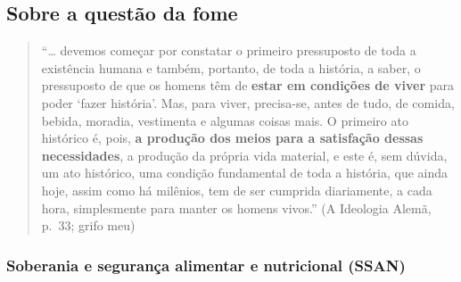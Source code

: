 \hypertarget{sobre-a-questuxe3o-da-fome}{%
\subsection{Sobre a questão da fome}\label{sobre-a-questuxe3o-da-fome}}

\begin{quote}
``\ldots{} devemos começar por constatar o primeiro pressuposto de toda
a existência humana e também, portanto, de toda a história, a saber, o
pressuposto de que os homens têm de \textbf{estar em condições de viver}
para poder `fazer história'. Mas, para viver, precisa-se, antes de tudo,
de comida, bebida, moradia, vestimenta e algumas coisas mais. O primeiro
ato histórico é, pois,
\textbf{a produção dos meios para a satisfação dessas necessidades}, a
produção da própria vida material, e este é, sem dúvida, um ato
histórico, uma condição fundamental de toda a história, que ainda hoje,
assim como há milênios, tem de ser cumprida diariamente, a cada hora,
simplesmente para manter os homens vivos.'' (A Ideologia Alemã, p.~33;
grifo meu)
\end{quote}

\hypertarget{soberania-e-seguranuxe7a-alimentar-e-nutricional-ssan}{%
\subsubsection{Soberania e segurança alimentar e nutricional
(SSAN)}\label{soberania-e-seguranuxe7a-alimentar-e-nutricional-ssan}}

